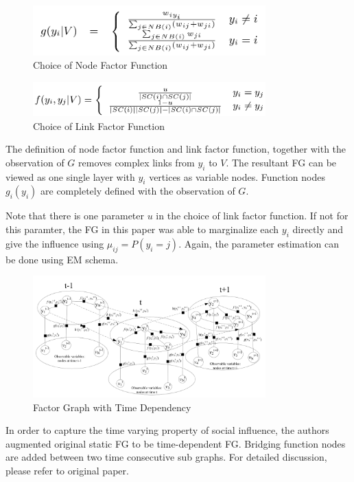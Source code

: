 \documentclass[11pt,a4paper]{article}
\begin{document}
\begin{figure}[htb]
\centering
	\includegraphics[width=0.8\textwidth]{fig/wang2011-nodefactor.png}
	\caption{Choice of Node Factor Function}
\end{figure}

\begin{figure}[htb]
\centering
	\includegraphics[width=0.8\textwidth]{fig/wang2011-edgefactor.png}
	\caption{Choice of Link Factor Function}
\end{figure}

The definition of node factor function and link factor function, together 
with the observation of $G$ removes complex links from $y_i$ to $V$. The 
resultant FG can be viewed as one single layer with $y_i$ vertices 
as variable nodes. Function nodes $g_i(y_i)$ are completely defined 
with the observation of $G$. 

Note that there is one parameter $u$ in the choice of 
link factor function. If not for this paramter, the FG in this paper
was able to marginalize each $y_i$ directly and give the influence 
using $\mu_{ij} = P(y_i=j)$. Again, the parameter estimation can be done
using EM schema. 

\begin{figure}[htb]
\centering
	\includegraphics[width=0.8\textwidth]{fig/wang2011-FG-dynamic.png}
	\caption{Factor Graph with Time Dependency}
\end{figure}

In order to capture the time varying property of social influence, the 
authors augmented original static FG to be time-dependent FG. Bridging 
function nodes are added between two time consecutive sub graphs. For 
detailed discussion, please refer to original paper. 
\end{document}
